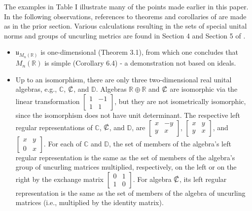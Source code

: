\documentclass{amsart}
\numberwithin{equation}{section}
\theoremstyle{definition}
\numberwithin{theorem}{section}
\begin{document}
 
 
 The examples in Table I illustrate many of the points made earlier in this paper.  In the following observations, references to theorems and corollaries of \cite{fgreensite:2023} are made as in the prior section.  Various calculations resulting in the sets of special unital norms and groups of uncurling metrics are found in Section 4 and Section 5 of \cite{fgreensite:2023}.

\begin{itemize}\item $\mathfrak{u}_{M_n(\mathbb{R})}$ is one-dimensional (Theorem 3.1), from which one concludes that $M_n(\mathbb{R})$ is simple (Corollary 6.4) - a demonstration not based on ideals.
\item Up to an isomorphism, there are only three two-dimensional real unital algebras, e.g., $\mathbb{C}$, $\slashed{\mathbb{C}}$, and $\mathbb{D}$.  Algebras $\mathbb{R}\oplus\mathbb{R}$ and $\slashed{\mathbb{C}}$ are isomorphic via the linear transformation $\left[\begin{array}{ccc}
 1 & -1   \\ 
 1 & 1    
\end{array}\right]$, but they are not isometrically isomorphic, since the isomorphism does not have unit determinant.  The respective left regular representations of $\mathbb{C}$, $\slashed{\mathbb{C}}$, and $\mathbb{D}$, are $\left[\begin{array}{ccc}
 x & -y   \\ 
 y & x    
\end{array}\right]$, $\left[\begin{array}{ccc}
 x & y   \\ 
 y & x    
\end{array}\right]$, and $\left[\begin{array}{ccc}
 x & y   \\ 
 0 & x    
\end{array}\right]$.  For each of $\mathbb{C}$ and $\mathbb{D}$, the set of members of the algebra's left regular representation is the same as the set of members of the algebra's group of uncurling matrices multiplied, respectively, on the left or on the right by the exchange matrix $\left[\begin{array}{ccc}
 0 & 1   \\ 
 1 & 0    
\end{array}\right]$. For algebra $\slashed{\mathbb{C}}$, its left regular representation is the same as the set of members of the algebra of uncurling matrices (i.e., multiplied by the identity matrix).

\end{itemize}
\end{document}
